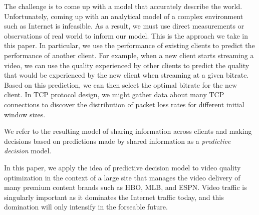 The challenge is to come up with a model that accurately describe the
world. Unfortunately, coming up with an analytical model of a complex
environment such as Internet is infeasible. As a result, we must use
direct measurements or observations of real world to inform our
model. This is the approach we take in this paper. In particular, we
use the performance of existing clients to predict the performance of
another client. For example, when a new client starts streaming a
video, we can use the quality experienced by other clients to predict
the quality that would be experienced by the new client when streaming
at a given bitrate. Based on this prediction, we can then select the
optimal bitrate for the new client.  In TCP protocol design, we might
gather data about many TCP connections to discover the distribution of
packet loss rates for different initial window sizes.  

We refer to the resulting model of sharing information
across clients and making decisions based on predictions made by
shared information as a {\it predictive decision} model. 




In this paper, we apply the idea of predictive decision model to video
quality optimization in the context of a large site that manages the
video delivery of many premium content brands such as HBO, MLB, and
ESPN. Video traffic is singularly important as it dominates the
Internet traffic today, and this domination will only intensify in the
forseable future.

